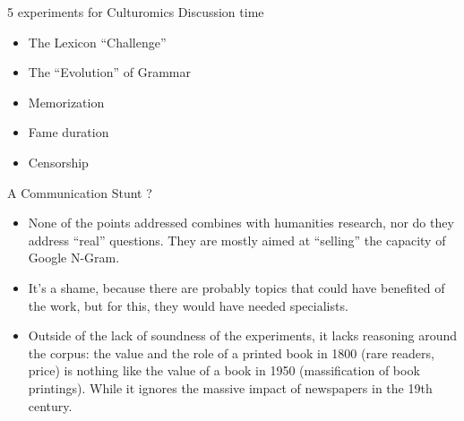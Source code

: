 \documentclass[aspectratio=169]{beamer}
\begin{document}
\begin{frame}{5 experiments for Culturomics}
    Discussion time
    \begin{itemize}
        \item The Lexicon ``Challenge'' 
        \item The ``Evolution'' of Grammar 
        \item Memorization 
        \item Fame duration 
        \item Censorship \note{}
    \end{itemize}
\end{frame}

\begin{frame}{A Communication Stunt ?}
    \begin{itemize}
        \item None of the points addressed combines with humanities research, nor do they address ``real'' questions. They are mostly aimed at ``selling'' the capacity of Google N-Gram.
        \item It's a shame, because there are probably topics that could have benefited of the work, but for this, they would have needed specialists.
        \item Outside of the lack of soundness of the experiments, it lacks reasoning around the corpus: the value and the role of a printed book in 1800 (rare readers, price) is nothing like the value of a book in 1950 (massification of book printings). While it ignores the massive impact of newspapers in the 19th century.
    \end{itemize}
\end{frame}
\end{document}
